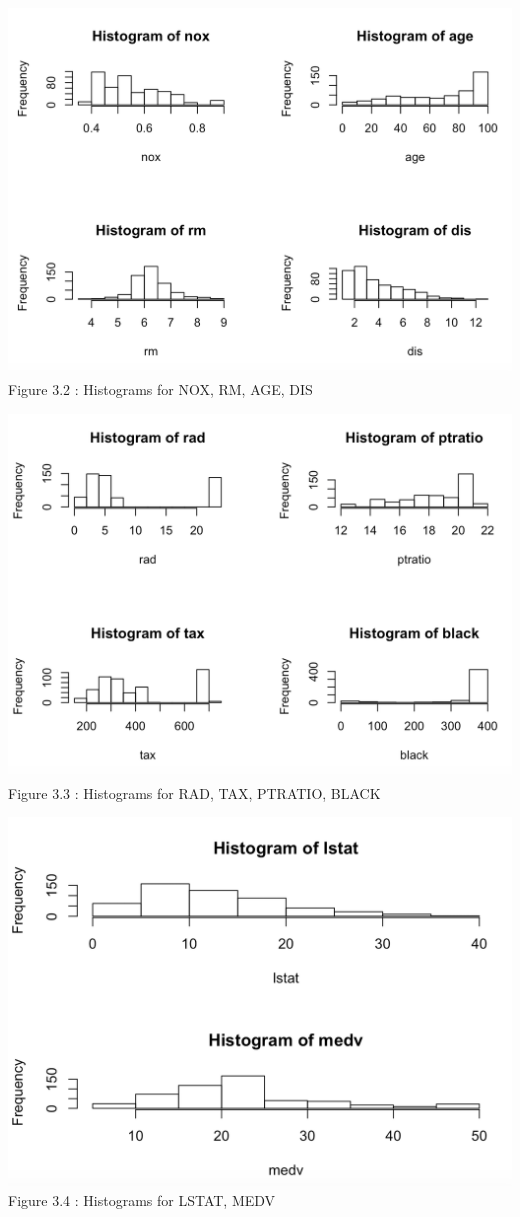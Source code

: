 \documentclass[11pt]{article}
\begin{document}
\begin{enumerate}
\begin{enumerate}
\begin{center}
    \includegraphics[height=0.5\textwidth]{s1_2.png}
    \\\footnotesize Figure 3.2 : Histograms for NOX, RM, AGE, DIS
    
    \includegraphics[height=0.5\textwidth]{s1_3.png}
    \\\footnotesize Figure 3.3 : Histograms for RAD, TAX, PTRATIO, BLACK
    
     \includegraphics[height=0.5\textwidth]{s1_4.png}
    \\\footnotesize Figure 3.4 : Histograms for LSTAT, MEDV
\end{center}
    

\end{enumerate}
\end{enumerate}
\end{document}
